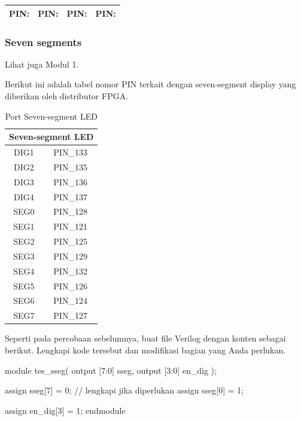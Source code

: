 \begin{table}[H]
{\centering
\begin{tabular}{|c|c|c|c|}
\hline
PIN: \hspace{2cm} & PIN: \hspace{2cm} & PIN: \hspace{2cm} & PIN: \hspace{2cm} \\
\hline
\end{tabular}
\par}
\end{table}


\subsubsection{Seven segments}

Lihat juga Modul 1.

Berikut ini adalah tabel nomor PIN terkait dengan seven-segment display
yang diberikan oleh distributor FPGA.

\begin{table}[H]
\caption{Port Seven-segment LED}\label{tab:pin_sseg}
\centering
\begin{tabular}{|c|c|}
\hline 
\multicolumn{2}{|c|}{Seven-segment LED} \\
\hline 
DIG1 & PIN\_133 \\
\hline 
DIG2 & PIN\_135 \\
\hline 
DIG3 & PIN\_136 \\
\hline 
DIG4 & PIN\_137 \\
\hline 
SEG0 & PIN\_128 \\
\hline 
SEG1 & PIN\_121 \\
\hline 
SEG2 & PIN\_125 \\
\hline
SEG3 & PIN\_129 \\
\hline
SEG4 & PIN\_132 \\
\hline
SEG5 & PIN\_126 \\
\hline
SEG6 & PIN\_124 \\
\hline
SEG7 & PIN\_127 \\
\hline 
\end{tabular}
\par
\end{table}

Seperti pada percobaan sebelumnya, buat file Verilog dengan konten sebagai berikut.
Lengkapi kode tersebut dan modifikasi bagian yang Anda perlukan.

\begin{verilogcode}
module tes_sseg(
  output [7:0] sseg,
  output [3:0] en_dig
);

  assign sseg[7] = 0;
  // lengkapi jika diperlukan
  assign sseg[0] = 1;
  
  assign en_dig[3] = 1;
endmodule
\end{verilogcode}

